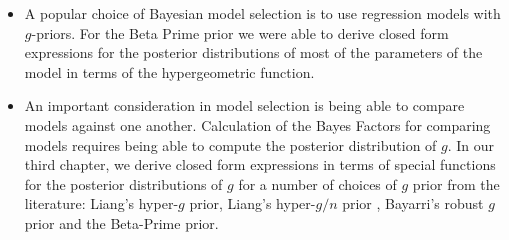 \begin{itemize}

\item A popular choice of Bayesian model selection is to use regression models
with $g$-priors. For the Beta Prime prior \citep{Maruyama2011} we were able to
derive closed form expressions for the posterior distributions of most of the
parameters of the model in terms of the hypergeometric function.




\item An important consideration in model selection is being able to compare
models against one another.  Calculation of the Bayes Factors for comparing
models requires being able to compute the posterior distribution of $g$. In our
third chapter, we derive closed form expressions in terms of special functions
for the posterior distributions of $g$ for a number of choices of $g$ prior from
the literature: Liang's hyper-$g$ prior, Liang's hyper-$g/n$ prior
\citep{Liang2008}, Bayarri's robust $g$ prior \citep{Bayarri2012} and the
Beta-Prime \citep{Maruyama2011} prior.



\end{itemize}

